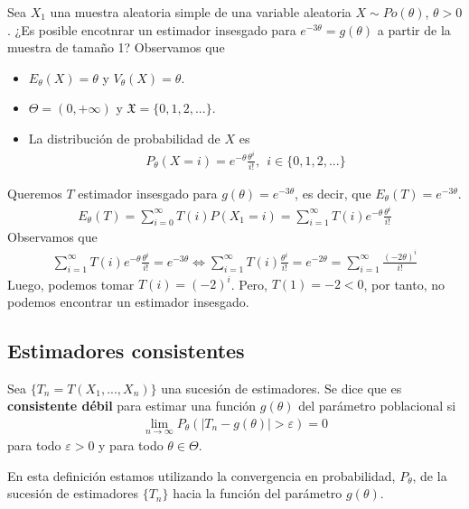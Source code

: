 \begin{ejemplo}
Sea $X_1$ una muestra aleatoria simple de una variable aleatoria $X \sim Po(\theta)$, $\theta > 0$. ¿Es posible encotnrar un estimador insesgado para $e^{-3\theta} = g(\theta)$ a partir de la muestra de tamaño 1? Observamos que
\begin{itemize}
    \item $E_{\theta}(X) = \theta$ y $V_{\theta}(X) = \theta$.
    \item $\Theta = (0,+\infty)$ y $\mathfrak{X} = \{0,1,2,...\}$.
    \item La distribución de probabilidad de $X$ es
    \begin{align*}
        P_{\theta}(X = i) = e^{-\theta} \frac{\theta^i}{i!}, \ \ i \in \{0,1,2,...\}
    \end{align*}
\end{itemize}
Queremos $T$ estimador insesgado para $g(\theta) = e^{-3\theta}$, es decir, que $E_{\theta}(T) = e^{-3\theta}$.
\begin{align*}
    E_{\theta}(T) = \sum_{i=0}^{\infty}{T(i)P(X_1 = i)} = \sum_{i=1}^{\infty}{T(i)e^{-\theta} \frac{\theta^i}{i!}}
\end{align*}
Observamos que
\begin{align*}
    \sum_{i=1}^{\infty}{T(i)e^{-\theta} \frac{\theta^i}{i!}} = e^{-3\theta} \Longleftrightarrow  \sum_{i=1}^{\infty}{T(i)\frac{\theta^i}{i!}} = e^{-2\theta} = \sum_{i=1}^{\infty}{\frac{(-2\theta)^i}{i!}}
\end{align*}
Luego, podemos tomar $T(i) = (-2)^i$. Pero, $T(1) = -2 < 0$, por tanto, no podemos encontrar un estimador insesgado.
\end{ejemplo}

\subsection{Estimadores consistentes}

\begin{defi}
Sea $\{T_n = T(X_1,...,X_n)\}$ una sucesión de estimadores. Se dice que es \textbf{consistente débil} para estimar una función $g(\theta)$ del parámetro poblacional si
\begin{align*}
    \lim_{n \to \infty}{P_{\theta}(|T_n - g(\theta)| > \varepsilon)} = 0
\end{align*}
para todo $\varepsilon > 0$ y para todo $\theta \in \Theta$.
\end{defi}
En esta definición estamos utilizando la convergencia en probabilidad, $P_{\theta}$, de la sucesión de estimadores $\{T_n\}$ hacia la función del parámetro $g(\theta)$.

